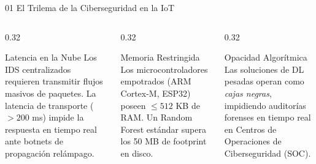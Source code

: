 \documentclass[aspectratio=169, 10pt]{beamer}
\begin{document}
\begin{frame}{01 \quad El Trilema de la Ciberseguridad en la IoT}
  \begin{columns}[T, onlytextwidth]
    \begin{column}{0.32\textwidth}
      \begin{block}{\textcolor{redsoft}{Latencia en la Nube}}
        \small Los IDS centralizados requieren transmitir flujos masivos de paquetes.
        La latencia de transporte ($>200$ ms) impide la respuesta en tiempo real
        ante botnets de propagación relámpago.
      \end{block}
    \end{column}
    \begin{column}{0.32\textwidth}
      \begin{block}{\textcolor{goldacc}{Memoria Restringida}}
        \small Los microcontroladores empotrados (ARM Cortex-M, ESP32) poseen
        $\leq 512$ KB de RAM. Un Random Forest estándar supera los 50 MB de
        footprint en disco.
      \end{block}
    \end{column}
    \begin{column}{0.32\textwidth}
      \begin{block}{\textcolor{bluesoft}{Opacidad Algorítmica}}
        \small Las soluciones de DL pesadas operan como \textit{cajas negras},
        impidiendo auditorías forenses en tiempo real en Centros de Operaciones
        de Ciberseguridad (SOC).
      \end{block}
    \end{column}
  \end{columns}

  \vspace{0.5cm}
  \begin{center}
  \end{center}
\end{frame}
\end{document}
